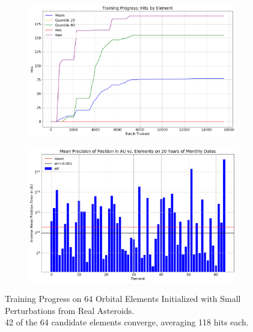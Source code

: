 \begin{figure}[h]
\begin{subfigure}[t]{\subfigwidth\textwidth}
\end{subfigure}
\hfill
\begin{subfigure}[t]{\subfigwidth\textwidth}
\centering
\includegraphics[width=\linewidth]{../figs/search_known/perturbed_small/learning_curve_hits.png}
\end{subfigure}
\medskip
\begin{subfigure}[t]{\textwidth}
\includegraphics[width=1.0\textwidth]{../figs/search_known/perturbed_small/near_ast_dist.png}
\end{subfigure}
\caption[Training Progress on 64 Orbital Elements Initialized with Small Perturbations]
{Training Progress on 64 Orbital Elements Initialized with Small Perturbations from Real Asteroids.\\
42 of the 64 candidate elements converge, averaging 118 hits each.}
\label{fig:TrainingPerturbedSmall}
\end{figure}
\clearpage

